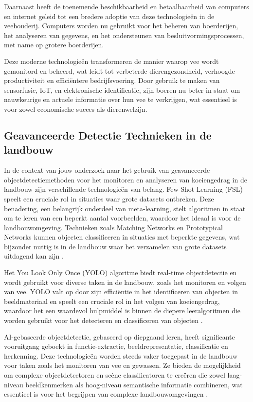Daarnaast heeft de toenemende beschikbaarheid en betaalbaarheid van computers en internet geleid tot een bredere adoptie van deze technologieën in de veehouderij. Computers worden nu gebruikt voor het beheren van boerderijen, het analyseren van gegevens, en het ondersteunen van besluitvormingsprocessen, met name op grotere boerderijen\autocite{IntechOpen}.

Deze moderne technologieën transformeren de manier waarop vee wordt gemonitord en beheerd, wat leidt tot verbeterde dierengezondheid, verhoogde productiviteit en efficiëntere bedrijfsvoering. Door gebruik te maken van sensorfusie, IoT, en elektronische identificatie, zijn boeren nu beter in staat om nauwkeurige en actuele informatie over hun vee te verkrijgen, wat essentieel is voor zowel economische succes als dierenwelzijn.
\subsection{Geavanceerde Detectie Technieken in de landbouw}
In de context van jouw onderzoek naar het gebruik van geavanceerde objectdetectiemethoden voor het monitoren en analyseren van koeiengedrag in de landbouw zijn verschillende technologieën van belang. Few-Shot Learning (FSL) speelt een cruciale rol in situaties waar grote datasets ontbreken. Deze benadering, een belangrijk onderdeel van meta-learning, stelt algoritmen in staat om te leren van een beperkt aantal voorbeelden, waardoor het ideaal is voor de landbouwomgeving. 
Technieken zoals Matching Networks en Prototypical Networks kunnen objecten classificeren in situaties met beperkte gegevens, wat bijzonder nuttig is in de landbouw waar het verzamelen van grote datasets uitdagend kan zijn \autocite{ObjectDetectionFewShotLearning2022}​​.

Het You Look Only Once (YOLO) algoritme biedt real-time objectdetectie en wordt gebruikt voor diverse taken in de landbouw, zoals het monitoren en volgen van vee. YOLO valt op door zijn efficiëntie in het identificeren van objecten in beeldmateriaal en speelt een cruciale rol in het volgen van koeiengedrag, waardoor het een waardevol hulpmiddel is binnen de diepere leeralgoritmen die worden gebruikt voor het detecteren en classificeren van objecten \autocite{Badgujar2024YOLO}​​.

AI-gebaseerde objectdetectie, gebaseerd op diepgaand leren, heeft significante vooruitgang geboekt in functie-extractie, beeldrepresentatie, classificatie en herkenning. Deze technologieën worden steeds vaker toegepast in de landbouw voor taken zoals het monitoren van vee en gewassen. Ze bieden de mogelijkheid om complexe objectdetectoren en scène classificatoren te creëren die zowel laag-niveau beeldkenmerken als hoog-niveau semantische informatie combineren, wat essentieel is voor het begrijpen van complexe landbouwomgevingen \autocite{FrontiersPlantScience2022}​.
